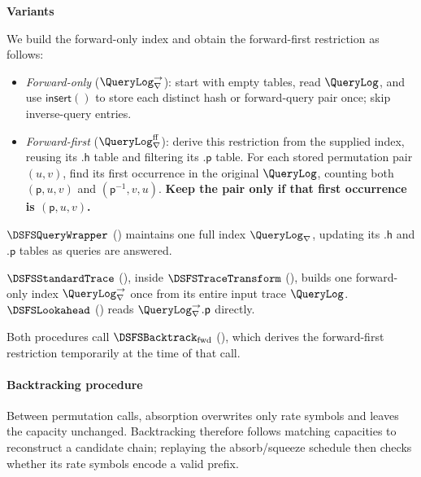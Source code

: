 \begin{definition}
\textbf{Variants}

We build the forward-only index and obtain the forward-first restriction as follows:
\begin{itemize}
\item \emph{Forward-only} (\(\QueryLog_{\nabla}^{\to}\)): start with empty tables, read \(\QueryLog\), and use \(\mathsf{insert()}\) to store each distinct hash or forward-query pair once; skip inverse-query entries.
\item \emph{Forward-first} (\(\QueryLog_{\nabla}^{\mathrm{ff}}\)): derive this restriction from the supplied index, reusing its \(\mathsf{.h}\) table and filtering its \(\mathsf{.p}\) table. For each stored permutation pair \((u,v)\), find its first occurrence in the original \(\QueryLog\), counting both \((\mathsf p,u,v)\) and \((\mathsf p^{-1},v,u)\). \textbf{Keep the pair only if that first occurrence is \((\mathsf p,u,v)\).}
\end{itemize}
\(\DSFSQueryWrapper\) () maintains one full index \(\QueryLog_{\nabla}\), updating its \(\mathsf{.h}\) and \(\mathsf{.p}\) tables as queries are answered.

\(\DSFSStandardTrace\) (), inside \(\DSFSTraceTransform\) (), builds one forward-only index \(\QueryLog_{\nabla}^{\to}\) once from its entire input trace \(\QueryLog\). \(\DSFSLookahead\) () reads \(\QueryLog_{\nabla}^{\to}.\mathsf p\) directly.

Both procedures call \(\DSFSBacktrack_{\mathrm{fwd}}\) (), which derives the forward-first restriction temporarily at the time of that call.
\end{definition}

\paragraph{Backtracking procedure}

Between permutation calls, absorption overwrites only rate symbols and leaves the capacity unchanged. Backtracking therefore follows matching capacities to reconstruct a candidate chain; replaying the absorb/squeeze schedule then checks whether its rate symbols encode a valid prefix.

